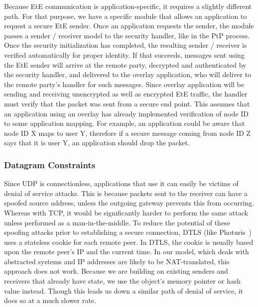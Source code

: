 \documentclass[conference]{IEEEtran}
\begin{document}
Because EtE communication is application-specific, it requires
a slightly different path.  For that purpose, we have a specific module that
allows an application to request a secure EtE sender.
Once an application requests the sender, the
module passes a sender / receiver model to the security handler, like in the PtP
process.  Once the security initialization has completed, the
resulting sender / receiver is verified automatically for proper identity.
If that succeeds, messages sent using the EtE sender will arrive at the remote
party, decrypted and authenticated by the security handler, and delivered to the
overlay application, who will deliver to the remote party's handler for such messages.
Since overlay application will be sending and receiving
unencrypted as well as encrypted EtE traffic, the handler must verify that the
packet was sent from a secure end point.  This assumes that an application using
an overlay has already implemented verification of node ID to some application
mapping.  For example, an application could be aware that node ID X maps to user
Y, therefore if a secure message coming from node ID Z says that it is user Y,
an application should drop the packet.

\subsubsection{Datagram Constraints}
Since UDP is connectionless, applications that use it can easily be victims of
denial of service attacks.  This is because packets sent to the receiver can
have a spoofed source address, unless the outgoing gateway prevents this from
occurring.  Whereas with TCP, it would be significantly harder to perform the
same attack unless performed as a man-in-the-middle.  To reduce the potential
of these spoofing attacks prior to establishing a secure connection, DTLS (like
Photuris~\cite{photuris}) uses a stateless cookie for each remote peer.  In
DTLS, the cookie is usually based upon the remote peer's IP and the current
time.  In our model, which deals with abstracted systems and IP addresses are
likely to be NAT-translated, this approach does not work.  Because we are
building on existing senders and receivers that already have state, we use the
object's memory pointer or hash value instead.  Though this leads us down a
similar path of denial of service, it does so at a much slower rate.
\end{document}
